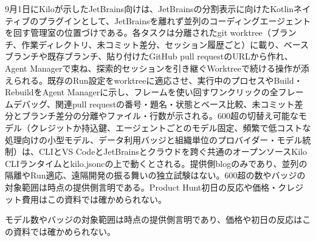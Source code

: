 9月1日にKiloが示したJetBrains向けは、JetBrainsの分割表示に向けたKotlinネイティブのプラグインとして、JetBrainsを離れず並列のコーディングエージェントを回す管理室の位置づけである\cite{kilojetbrains}。各タスクは分離されたgit worktree（ブランチ、作業ディレクトリ、未コミット差分、セッション履歴ごと）に載り、ベースブランチや既存ブランチ、貼り付けたGitHub pull requestのURLから作れ、Agent Managerで束ね、探索的セッションを引き継ぐWorktreeで続ける操作が添えられる。既存のRun設定をworktreeに適応させ、実行中のプロセスやBuild・RebuildをAgent Managerに示し、フレームを使い回すワンクリックの全フレームデバッグ、関連pull requestの番号・題名・状態とベース比較、未コミット差分とブランチ差分の分離やファイル・行数が示される。600超の切替え可能なモデル（クレジットか持込鍵、エージェントごとのモデル固定、頻繁で低コストな処理向けの小型モデル、データ利用バッジと組織単位のプロバイダー・モデル統制）は、CLIとVS CodeとJetBrainsとクラウドを跨ぐ共通のオープンソースKilo CLIランタイムとkilo.jsoncの上で動くとされる。提供側blogのみであり、並列の隔離やRun適応、遠隔開発の振る舞いの独立試験はない。600超の数やバッジの対象範囲は時点の提供側言明である。Product Hunt初日の反応や価格・クレジット費用はこの資料では確かめられない。

\begin{technicalnote}[時点の言明]
モデル数やバッジの対象範囲は時点の提供側言明であり、価格や初日の反応はこの資料では確かめられない\cite{kilojetbrains}。
\end{technicalnote}
